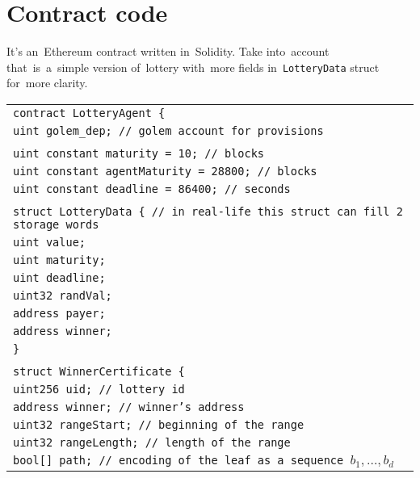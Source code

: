 \documentclass[a4paper]{article}
\begin{document}
\section{Contract code}
\label{sec:code}

    It's an~Ethereum contract written in~Solidity. Take into~account that~is~a~simple version of~lottery with~more
    fields in~\texttt{LotteryData} struct for~more clarity.

    \begin{tabularx}{\linewidth}{l}
        \texttt{contract LotteryAgent \{}\\
        \qquad\texttt{uint golem\_dep;  // golem account for~provisions}\\
        \\
        \qquad\texttt{uint constant maturity = 10; // blocks}\\
        \qquad\texttt{uint constant agentMaturity = 28800; // blocks}\\
        \qquad\texttt{uint constant deadline = 86400; // seconds}\\
        \\
        \qquad\texttt{struct LotteryData \{  // in~real-life this struct can fill 2 storage words}\\
        \qquad\qquad\texttt{uint value;}\\
        \qquad\qquad\texttt{uint maturity;}\\
        \qquad\qquad\texttt{uint deadline;}\\
        \qquad\qquad\texttt{uint32 randVal;}\\
        \qquad\qquad\texttt{address payer;}\\
        \qquad\qquad\texttt{address winner;}\\
        \qquad\texttt{\}}\\
        \\
        \qquad\texttt{struct WinnerCertificate \{}\\
        \qquad\qquad\texttt{uint256 uid;        // lottery id}\\
        \qquad\qquad\texttt{address winner;     // winner's address}\\
        \qquad\qquad\texttt{uint32 rangeStart;  // beginning of~the~range}\\
        \qquad\qquad\texttt{uint32 rangeLength; // length of~the~range}\\
        \qquad\qquad\texttt{bool[] path;        // encoding of~the~leaf as a~sequence $b_1, \ldots, b_d$}\\

\end{tabularx}
\end{document}
